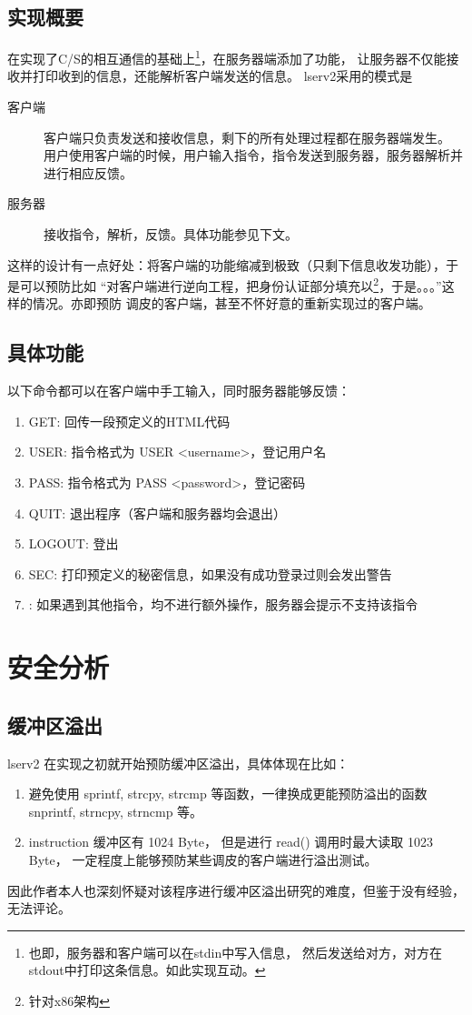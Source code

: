 \documentclass[a4paper,12pt]{article}
\begin{document}
\begin{CJK}{UTF8}{gbsn}
	\subsection{实现概要}
		在实现了C/S的相互通信的基础上\footnote{也即，服务器和客户端可以在stdin中写入信息，
		然后发送给对方，对方在stdout中打印这条信息。如此实现互动。}，在服务器端添加了功能，
		让服务器不仅能接收并打印收到的信息，还能解析客户端发送的信息。\newline
		lserv2采用的模式是
		\begin{description}
		\item[客户端] 客户端只负责发送和接收信息，剩下的所有处理过程都在服务器端发生。
		用户使用客户端的时候，用户输入指令，指令发送到服务器，服务器解析并进行相应反馈。
		\item[服务器] 接收指令，解析，反馈。具体功能参见下文。
		\end{description}
		这样的设计有一点好处：将客户端的功能缩减到极致（只剩下信息收发功能），于是可以预防比如
		“对客户端进行逆向工程，把身份认证部分填充以\footnote{针对x86架构}，于是。。。”这样的情况。亦即预防
		调皮的客户端，甚至不怀好意的重新实现过的客户端。
	\subsection{具体功能}
		以下命令都可以在客户端中手工输入，同时服务器能够反馈：
		\begin{enumerate}
		\item GET: 回传一段预定义的HTML代码
		\item USER: 指令格式为 USER <username>，登记用户名
		\item PASS: 指令格式为 PASS <password>，登记密码
		\item QUIT: 退出程序（客户端和服务器均会退出）
		\item LOGOUT: 登出
		\item SEC: 打印预定义的秘密信息，如果没有成功登录过则会发出警告
		\item \*: 如果遇到其他指令，均不进行额外操作，服务器会提示不支持该指令
		\end{enumerate}

\section{安全分析}
	\subsection{缓冲区溢出}
		lserv2 在实现之初就开始预防缓冲区溢出，具体体现在比如：
		\begin{enumerate}
		\item 避免使用 sprintf, strcpy, strcmp 等函数，一律换成更能预防溢出的函数 snprintf, strncpy, strncmp 等。
		\item instruction 缓冲区有 1024 Byte， 但是进行 read() 调用时最大读取 1023 Byte， 一定程度上能够预防某些调皮的客户端进行溢出测试。
		\end{enumerate}
		因此作者本人也深刻怀疑对该程序进行缓冲区溢出研究的难度，但鉴于没有经验，无法评论。

\end{CJK}
\end{document}
